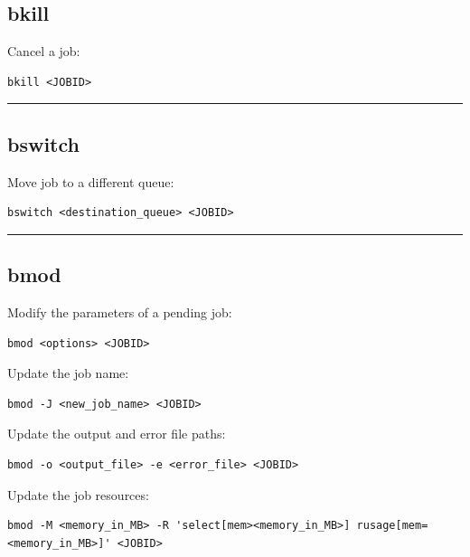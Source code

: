 \documentclass[11pt]{article}
\begin{document}
    \subsection{bkill}\label{bkill}

Cancel a job:

\begin{verbatim}
bkill <JOBID>
\end{verbatim}

    \begin{center}\rule{0.5\linewidth}{\linethickness}\end{center}

    \subsection{bswitch}\label{bswitch}

Move job to a different queue:

\begin{verbatim}
bswitch <destination_queue> <JOBID>
\end{verbatim}

    \begin{center}\rule{0.5\linewidth}{\linethickness}\end{center}

    \subsection{bmod}\label{bmod}

Modify the parameters of a pending job:

\begin{verbatim}
bmod <options> <JOBID>
\end{verbatim}

Update the job name:

\begin{verbatim}
bmod -J <new_job_name> <JOBID>
\end{verbatim}

Update the output and error file paths:

\begin{verbatim}
bmod -o <output_file> -e <error_file> <JOBID>
\end{verbatim}

Update the job resources:

\begin{verbatim}
bmod -M <memory_in_MB> -R 'select[mem><memory_in_MB>] rusage[mem=<memory_in_MB>]' <JOBID>
\end{verbatim}
\end{document}
